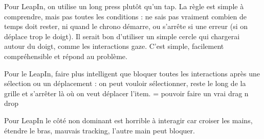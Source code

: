 Pour LeapIn, on utilise un long press plutôt qu'un tap. La règle est simple à comprendre, mais pas toutes les conditions : ne sais pas vraiment combien de temps doit rester, ni quand le chrono démarre, ou s'arrête si une erreur (si on déplace trop le doigt). Il serait bon d'utiliser un simple cercle qui chargerai autour du doigt, comme les interactions gaze. C'est simple, facilement compréhensible et répond au problème.

Pour le LeapIn, faire plus intelligent que bloquer toutes les interactions après une sélection ou un déplacement : on peut vouloir sélectionner, reste le long de la grille et s'arrêter là où on veut déplacer l'item. = pouvoir faire un vrai drag n drop

Pour LeapIn le côté non dominant est horrible à interagir car croiser les mains, étendre le bras, mauvais tracking, l'autre main peut bloquer.

 



